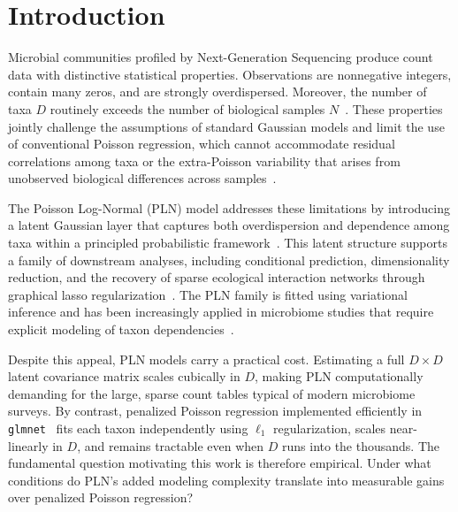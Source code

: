 \documentclass[USenglish]{article}
\theoremstyle{dgthm}
\begin{document}

\maketitle

\section{Introduction}
Microbial communities profiled by Next-Generation Sequencing produce count data with distinctive statistical properties.
Observations are nonnegative integers, contain many zeros, and are strongly overdispersed.   
Moreover, the number of taxa $D$ routinely exceeds the number of biological samples $N$~\citep{Kodikara2022}.
These properties jointly challenge the assumptions of standard Gaussian models and limit the use of conventional Poisson regression, which cannot accommodate residual correlations among taxa or the extra-Poisson variability that arises from unobserved biological differences across samples~\citep{mcmurdie2014waste, Chiquet2021}.

The Poisson Log-Normal (PLN) model addresses these limitations by introducing a latent Gaussian layer that captures both overdispersion and dependence among taxa within a principled probabilistic framework~\citep{aitchison1989multivariate, Chiquet2021}.
This latent structure supports a family of downstream analyses, including conditional prediction, dimensionality reduction, and the recovery of sparse ecological interaction networks through graphical lasso regularization~\citep{chiquet2019variational}.
The PLN family is fitted using variational inference and has been increasingly applied in microbiome studies that require explicit modeling of taxon dependencies~\citep{Chiquet2021, SUBEDI20251255}.

Despite this appeal, PLN models carry a practical cost.
Estimating a full $D \times D$ latent covariance matrix scales cubically in $D$, making PLN computationally demanding for the large, sparse count tables typical of modern microbiome surveys.
By contrast, penalized Poisson regression implemented efficiently in \texttt{glmnet}~\citep{Friedman2010} fits each taxon independently using $\ell_1$ regularization, scales near-linearly in $D$, and remains tractable even when $D$ runs into the thousands.
The fundamental question motivating this work is therefore empirical.
Under what conditions do PLN's added modeling complexity translate into measurable gains over penalized Poisson regression?
\end{document}
